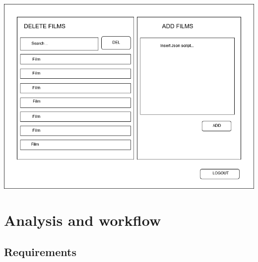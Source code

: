 \documentclass[a4paper, oneside]{article}
\begin{document}
\begin{minipage}{\linewidth}
\begin{center}
\vspace{8mm}
\includegraphics[width=\textwidth]{./images/diagrams/admin_activity} 
\vspace{3mm}
\label{fig:mockup_admin}
\end{center}
\end{minipage}



\clearpage

\section{Analysis and workflow}

\subsection{Requirements}
\end{document}
